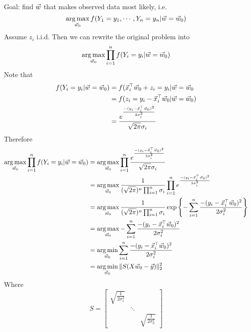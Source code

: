 \begin{theorem}
	Goal: find $\vec{w}$ that makes observed data most likely, i.e.
	\[
\operatorname*{arg\,max}_{\vec{w}_0} f(Y_1 = y_1,\cdots,Y_n=y_n|\vec{w} = \vec{w}_0)
	\]
	Assume $z_i$ i.i.d. Then we can rewrite the original problem into
	\[
\operatorname*{arg\,max}_{\vec{w}_0}\prod_{i=1}^nf(Y_i=y_i|\vec{w} = \vec{w}_0)
	\]
	Note that
	\begin{align*}
		f(Y_i=y_i|\vec{w}=\vec{w}_0) &= f(\vec{x}_i^\top\vec{w}_0+z_i=y_i|\vec{w}=\vec{w}_0\\
		&= f(z_i=y_i-\vec{x}_i^\top\vec{w}_0|\vec{w}=\vec{w}_0)\\
		&= \frac{e^{\frac{-(y_i-\vec{x}_i^\top\vec{w}_0)^2}{2\sigma_i^2}}}{\sqrt{2\pi}\sigma_i}
	\end{align*}
	Therefore
	\begin{align*}
	\operatorname*{arg\,max}_{\vec{w}_0}\prod_{i=1}^nf(Y_i=y_i|\vec{w} = \vec{w}_0) &= \operatorname*{arg\,max}_{\vec{w}_0}\prod_{i=1}^n\frac{e^{\frac{-(y_i-\vec{x}_i^\top\vec{w}_0)^2}{2\sigma_i^2}}}{\sqrt{2\pi}\sigma_i}\\
		&= \operatorname*{arg\,max}_{\vec{w}_0} \frac{1}{(\sqrt{2\pi})^n\prod_{i=1}^n\sigma_i} \prod_{i=1}^ne^{\frac{-(y_i-\vec{x}_i^\top\vec{w}_0)^2}{2\sigma_i^2}}\\
		&= \operatorname*{arg\,max}_{\vec{w}_0} \frac{1}{(\sqrt{2\pi})^n\prod_{i=1}^n\sigma_i} \exp\left\{-\sum_{i=1}^n\frac{-(y_i-\vec{x}_i^\top\vec{w}_0)^2}{2\sigma_i^2}\right\}\\
		&= \operatorname*{arg\,max}_{\vec{w}_0} -\sum_{i=1}^n\frac{-(y_i-\vec{x}_i^\top\vec{w}_0)^2}{2\sigma_i^2}\\
		&= \operatorname*{arg\,min}_{\vec{w}_0} \sum_{i=1}^n\frac{-(y_i-\vec{x}_i^\top\vec{w}_0)^2}{2\sigma_i^2}\\
		&= \operatorname*{arg\,min}_{\vec{w}_0} \|S(X\vec{w}_0-\vec{y})\|^2_2
	\end{align*}
	Where
	\[
S = \begin{bmatrix}
			\sqrt{\frac{1}{2 \sigma_1^2}} &&\\
			&\ddots&\\
			&&\sqrt{\frac{1}{2 \sigma_n^2}}
	\end{bmatrix}
	\]
\end{theorem}

